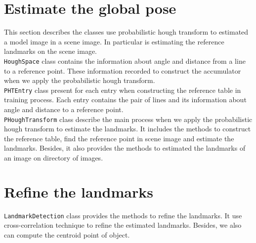 \section{Estimate the global pose}
This section describes the classes use probabilistic hough transform to estimated a model image in a scene image. In particular is estimating the reference landmarks on the scene image.\\[0.2cm]
\texttt{HoughSpace} class contains the information about angle and distance from a line to a reference point. These information recorded to construct the accumulator when we apply the probabilistic hough transform.\\[0.2cm]
\texttt{PHTEntry} class present for each entry when constructing the reference table in training process. Each entry contains the pair of lines and its information about angle and distance to a reference point.\\[0.2cm]
\texttt{PHoughTransform} class describe the main process when we apply the probabilistic hough transform to estimate the landmarks. It includes the methods to construct the reference table, find the reference point in scene image and estimate the landmarks. Besides, it also provides the methods to estimated the landmarks of an image on directory of images.
\section{Refine the landmarks}
\texttt{LandmarkDetection} class provides the methods to refine the landmarks. It use cross-correlation technique to refine the estimated landmarks. Besides, we also can compute the centroid point of object.
